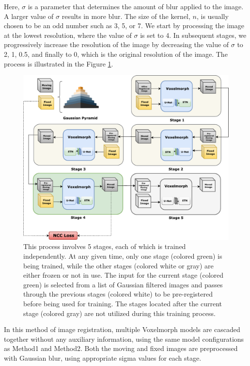 \documentclass{report}
\begin{document}
	Here, $\sigma$ is a parameter that determines the amount of blur applied to the image. A larger value of $\sigma$ results in more blur. The size of the kernel, $n$, is usually chosen to be an odd number such as 3, 5, or 7. We start by processing the image at the lowest resolution, where the value of $\sigma$ is set to 4. In subsequent stages, we progressively increase the resolution of the image by decreasing the value of $\sigma$ to 2, 1, 0.5, and finally to 0, which is the original resolution of the image.
	The process is illustrated in the Figure \ref{fig:block_method3}.
	
    \begin{figure}[h!]
		\centering
		\includegraphics[width=\columnwidth]{resources/chapter4/methods/Method3.pdf}
		\caption{This process involves 5 stages, each of which is trained independently. At any given time, only one stage (colored green) is being trained, while the other stages (colored white or gray) are either frozen or not in use. The input for the current stage (colored green) is selected from a list of Gaussian filtered images and passes through the previous stages (colored white) to be pre-registered before being used for training. The stages located after the current stage (colored gray) are not utilized during this training process.}
		\label{fig:block_method3}
	\end{figure}

	In this method of image registration, multiple Voxelmorph models are cascaded together without any auxiliary information, using the same model configurations as Method1 and Method2. Both the moving and fixed images are preprocessed with Gaussian blur, using appropriate sigma values for each stage.
	
\end{document}
